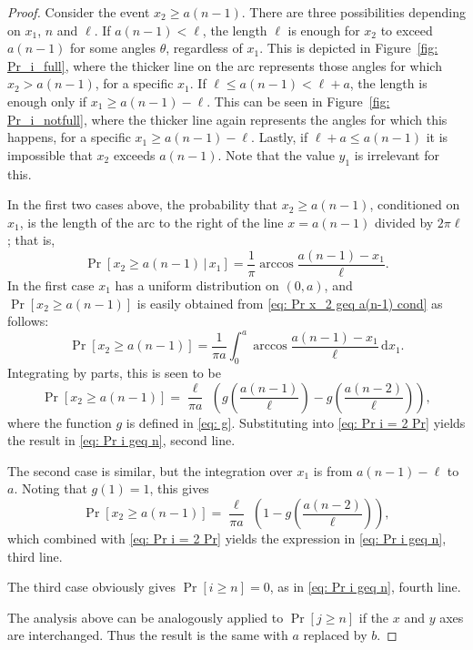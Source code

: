 \documentclass[12pt, a4paper]{article}
\newcommand{\cond}{\,|\,} %
\newcommand{\diff}{\,\mathrm d}
\newcommand{\len}{\ell} %
\newcommand{\orient}{\theta}
\begin{document}
\begin{proof}
Consider the event $x_2 \geq a(n-1)$. There are three possibilities depending on $x_1$, $n$ and $\len$. If $a(n-1) < \len$, the length $\len$ is enough for $x_2$ to exceed $a(n-1)$ for some angles $\orient$, regardless of $x_1$. This is depicted in Figure~\ref{fig: Pr_i_full}, where the thicker line on the arc represents those angles for which $x_2 > a(n-1)$, for a specific $x_1$. If $\len \leq a(n-1) < \len+a$, the length is enough only if $x_1 \geq a(n-1)-\len$. This can be seen in Figure~\ref{fig: Pr_i_notfull}, where the thicker line again represents the angles for which this happens, for a specific $x_1 \geq a(n-1)-\len$. Lastly, if $\len+a \leq a(n-1)$ it is impossible that $x_2$ exceeds $a(n-1)$. Note that the value $y_1$ is irrelevant for this.

In the first two cases above, the probability that $x_2 \geq a(n-1)$, conditioned on $x_1$, is the length of the arc to the right of the line $x=a(n-1)$ divided by $2\pi\len$; that is,
\begin{equation}
\label{eq: Pr x_2 geq a(n-1) cond}
\Pr[x_2 \geq a(n-1) \cond x_1] = \frac 1 \pi \arccos \frac{a(n-1)-x_1}{\len}.
\end{equation}
In the first case $x_1$ has a uniform distribution on $(0,a)$, and $\Pr[x_2 \geq a(n-1)]$ is easily obtained from \eqref{eq: Pr x_2 geq a(n-1) cond} as follows:
\begin{equation}
\Pr[x_2 \geq a(n-1)] = \frac 1 {\pi a} \int_0^a\arccos \frac{a(n-1)-x_1}{\len} \diff x_1. 
\end{equation}
Integrating by parts, this is seen to be
\begin{equation}
\label{eq: Pr x_2 geq a(n-1), first case}
\Pr[x_2 \geq a(n-1)] = \frac{\len}{\pi a}\,\, \left( g\left( \frac{a(n-1)}{\len} \right) - g\left( \frac{a(n-2)}{\len} \right) \right),
\end{equation}
where the function $g$ is defined in \eqref{eq: g}. Substituting into \eqref{eq: Pr i = 2 Pr} yields the result in \eqref{eq: Pr i geq n}, second line.

The second case is similar, but the integration over $x_1$ is from $a(n-1)-\len$ to $a$. Noting that $g(1)=1$, this gives
\begin{equation}
\label{eq: Pr x_2 geq a(n-1), second case}
\Pr[x_2 \geq a(n-1)] = \frac{\len}{\pi a}\,\, \left( 1 - g\left( \frac{a(n-2)}{\len} \right) \right),
\end{equation}
which combined with \eqref{eq: Pr i = 2 Pr} yields the expression in \eqref{eq: Pr i geq n}, third line.

The third case obviously gives $\Pr[i \geq n] = 0$, as in \eqref{eq: Pr i geq n}, fourth line.

The analysis above can be analogously applied to $\Pr[j \geq n]$ if the $x$ and $y$ axes are interchanged. Thus the result is the same with $a$ replaced by $b$.
\end{proof}
\end{document}
